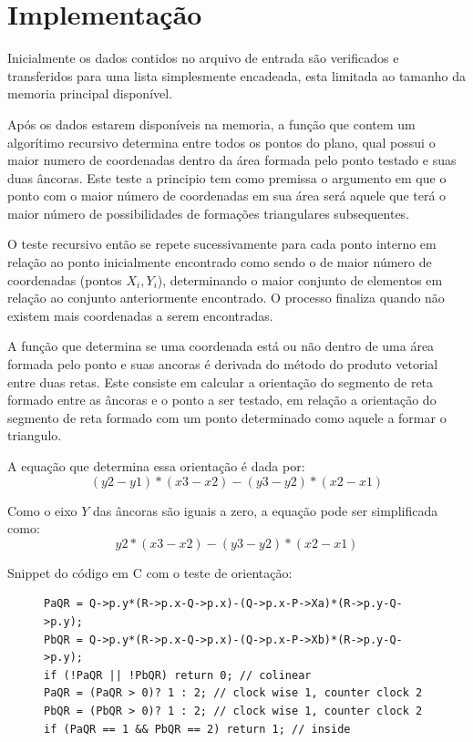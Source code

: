 \documentclass[12pt,a4paper]{article}
\begin{document}
\section{Implementação}

Inicialmente os dados contidos no arquivo de entrada são verificados e transferidos para uma lista simplesmente encadeada, esta limitada ao tamanho da memoria principal disponível.

Após os dados estarem disponíveis na memoria, a função que contem um algorítimo recursivo determina entre todos os pontos do plano, qual possui o maior numero de coordenadas dentro da área formada pelo ponto testado e suas duas âncoras. Este teste a principio tem como premissa o argumento em que o ponto com o maior número de coordenadas em sua área será aquele que terá o maior número de possibilidades de formações triangulares subsequentes.

O teste recursivo então se repete sucessivamente para cada ponto interno em relação ao ponto inicialmente encontrado como sendo o de maior número de coordenadas (pontos $X_i,Y_i$), determinando o maior conjunto de elementos em relação ao conjunto anteriormente encontrado. O processo finaliza quando não existem mais coordenadas a serem encontradas.

A função que determina se uma coordenada está ou não dentro de uma área formada pelo ponto e suas ancoras é derivada do método do produto vetorial entre duas retas.\cite{jules:test} Este consiste em calcular a orientação do segmento de reta formado entre as âncoras e o ponto a ser testado, em relação a orientação do segmento de reta formado com um ponto determinado como aquele a formar o triangulo.

A equação que determina essa orientação é dada por:
\[(y2-y1)*(x3-x2) - (y3-y2)*(x2-x1)\]

Como o eixo $Y$ das âncoras são iguais a zero, a equação pode ser simplificada como:\\ \[y2*(x3-x2) - (y3-y2)*(x2-x1)\]

Snippet do código em C com o teste de orientação:

\begin{figure}[!h]
\centering
\begin{BVerbatim}
PaQR = Q->p.y*(R->p.x-Q->p.x)-(Q->p.x-P->Xa)*(R->p.y-Q->p.y);
PbQR = Q->p.y*(R->p.x-Q->p.x)-(Q->p.x-P->Xb)*(R->p.y-Q->p.y);
if (!PaQR || !PbQR) return 0; // colinear	
PaQR = (PaQR > 0)? 1 : 2; // clock wise 1, counter clock 2
PbQR = (PbQR > 0)? 1 : 2; // clock wise 1, counter clock 2
if (PaQR == 1 && PbQR == 2) return 1; // inside
\end{BVerbatim}
\end{figure}
\end{document}
